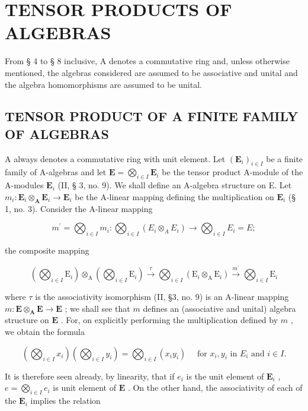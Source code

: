 \section{TENSOR PRODUCTS OF ALGEBRAS}

From § 4 to § 8 inclusive, A denotes a commutative ring and, unless otherwise mentioned, the algebras considered are assumed to be associative and unital and the algebra homomorphisms are assumed to be unital.

\subsection{TENSOR PRODUCT OF A FINITE FAMILY OF ALGEBRAS}

A always denotes a commutative ring with unit element. Let \((\mathbf{E}_i)_{i\in I}\) be a finite family of A-algebras and let \(\mathbf{E} = \bigotimes_{i\in I}\mathbf{E}_i\) be the tensor product A-module of the A-modules \(\mathbf{E}_i\) (II, § 3, no. 9). We shall define an A-algebra structure on E. Let \(m_i\colon \mathbf{E}_i\otimes_\mathbf{A}\mathbf{E}_i\to \mathbf{E}_i\) be the A-linear mapping defining the multiplication on \(\mathbf{E}_i\) (§ 1, no. 3). Consider the A-linear mapping

\[
m ^ {\prime} = \bigotimes_ {i \in I} m _ {i}: \bigotimes_ {i \in I} (E _ {i} \otimes_ {A} E _ {i}) \rightarrow \bigotimes_ {i \in I} E _ {i} = E;
\]

the composite mapping

\[
\left(\bigotimes_ {i \in I} \mathrm{E} _ {i}\right) \otimes_ {\mathrm{A}} \left(\bigotimes_ {i \in I} \mathrm{E} _ {i}\right) \xrightarrow {\tau} \bigotimes_ {i \in I} \left(\mathrm{E} _ {i} \otimes_ {\mathrm{A}} \mathrm{E} _ {i}\right) \xrightarrow {m ^ {\prime}} \bigotimes_ {i \in I} \mathrm{E} _ {i}
\]

where \(\tau\) is the associativity isomorphism (II, §3, no. 9) is an A-linear mapping \(m\colon \mathbf{E} \otimes_{\mathbf{A}} \mathbf{E} \to \mathbf{E}\) ; we shall see that \(m\) defines an (associative and unital) algebra structure on \(\mathbf{E}\) . For, on explicitly performing the multiplication defined by \(m\) , we obtain the formula

\[
\left(\bigotimes_ {i \in I} x _ {i}\right) \left(\bigotimes_ {i \in I} y _ {i}\right) = \bigotimes_ {i \in I} \left(x _ {i} y _ {i}\right) \quad \text { for } x _ {i}, y _ {i} \text { in } E _ {i} \text { and } i \in I.\tag{1}
\]

It is therefore seen already, by linearity, that if \(e_i\) is the unit element of \(\mathbf{E}_i\) , \(e = \bigotimes_{i \in I} e_i\) is unit element of \(\mathbf{E}\) . On the other hand, the associativity of each of the \(\mathbf{E}_i\) implies the relation

